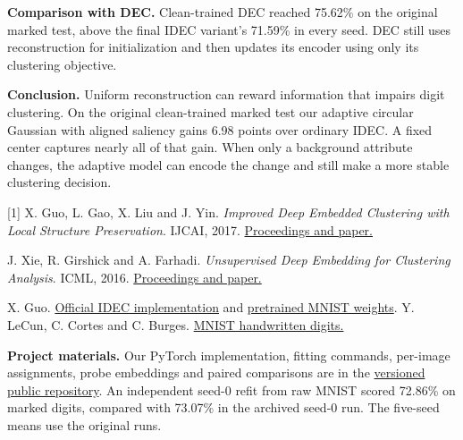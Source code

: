 \documentclass[11pt,letterpaper]{article}
\newcommand{\sect}[1]{\vspace{3pt}{\sffamily\large\bfseries\color{ink}#1}\par}
\begin{document}
\textbf{Comparison with DEC.} Clean-trained DEC reached 75.62\% on the original marked test, above the final IDEC variant's 71.59\% in every seed. DEC still uses reconstruction for initialization and then updates its encoder using only its clustering objective.

\textbf{Conclusion.} Uniform reconstruction can reward information that impairs digit clustering. On the original clean-trained marked test our adaptive circular Gaussian with aligned saliency gains 6.98 points over ordinary IDEC. A fixed center captures nearly all of that gain. When only a background attribute changes, the adaptive model can encode the change and still make a more stable clustering decision.

\sect{8 \quad References and reproducibility}
{\small
[1] X. Guo, L. Gao, X. Liu and J. Yin. \emph{Improved Deep Embedded Clustering with Local Structure Preservation}. IJCAI, 2017. \href{https://www.ijcai.org/proceedings/2017/243}{Proceedings and paper.}\par
[2] J. Xie, R. Girshick and A. Farhadi. \emph{Unsupervised Deep Embedding for Clustering Analysis}. ICML, 2016. \href{https://proceedings.mlr.press/v48/xieb16.html}{Proceedings and paper.}\par
[3] X. Guo. \href{https://github.com/XifengGuo/IDEC/tree/4a661c211f082022249758ab3312f7db21e2aa99}{Official IDEC implementation} and \href{https://github.com/XifengGuo/data-and-models/tree/d361bfe06686c0762df58624ef95a8c0fc9162be}{pretrained MNIST weights}. Y. LeCun, C. Cortes and C. Burges. \href{https://www.tensorflow.org/datasets/catalog/mnist}{MNIST handwritten digits.}\par
\textbf{Project materials.} Our PyTorch implementation, fitting commands, per-image assignments, probe embeddings and paired comparisons are in the \href{https://github.com/JohnR31N/cs126FinalProj/tree/idec-final-v2.2}{versioned public repository}. An independent seed-0 refit from raw MNIST scored 72.86\% on marked digits, compared with 73.07\% in the archived seed-0 run. The five-seed means use the original runs.}
\end{document}

